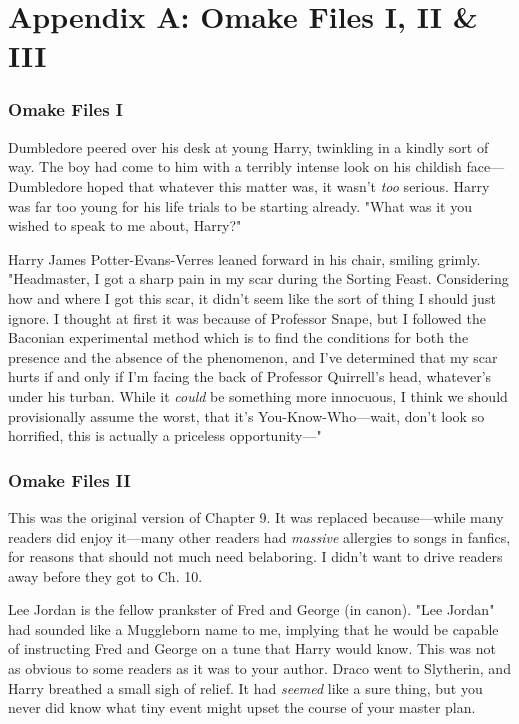 \chapter{Appendix A: Omake Files I, II \& III}

\subsection{Omake Files I}
Dumbledore peered over his desk at young Harry, twinkling in a kindly sort of 
way. The boy had come to him with a terribly intense look on his childish 
face---Dumbledore hoped that whatever this matter was, it wasn't \emph{too} 
serious. Harry was far too young for his life trials to be starting already. 
"What was it you wished to speak to me about, Harry?"

Harry James Potter-Evans-Verres leaned forward in his chair, smiling grimly. 
"Headmaster, I got a sharp pain in my scar during the Sorting Feast. 
Considering how and where I got this scar, it didn't seem like the sort of 
thing I should just ignore. I thought at first it was because of Professor 
Snape, but I followed the Baconian experimental method which is to find the 
conditions for both the presence and the absence of the phenomenon, and I've 
determined that my scar hurts if and only if I'm facing the back of Professor 
Quirrell's head, whatever's under his turban. While it \emph{could} be 
something more innocuous, I think we should provisionally assume the worst, 
that it's You-Know-Who---wait, don't look so horrified, this is actually a 
priceless opportunity---"
\sbreak
\vspace{-2\baselineskip}
\subsection{Omake Files II}
This was the original version of Chapter 9. It was replaced because---while 
many readers did enjoy it---many other readers had \emph{massive} allergies to 
songs in fanfics, for reasons that should not much need belaboring. I didn't 
want to drive readers away before they got to Ch. 10.

Lee Jordan is the fellow prankster of Fred and George (in canon). "Lee Jordan" 
had sounded like a Muggleborn name to me, implying that he would be capable of 
instructing Fred and George on a tune that Harry would know. This was not as 
obvious to some readers as it was to your author.
\sbreak
Draco went to Slytherin, and Harry breathed a small sigh of relief. It had 
\emph{seemed} like a sure thing, but you never did know what tiny event might 
upset the course of your master plan.

